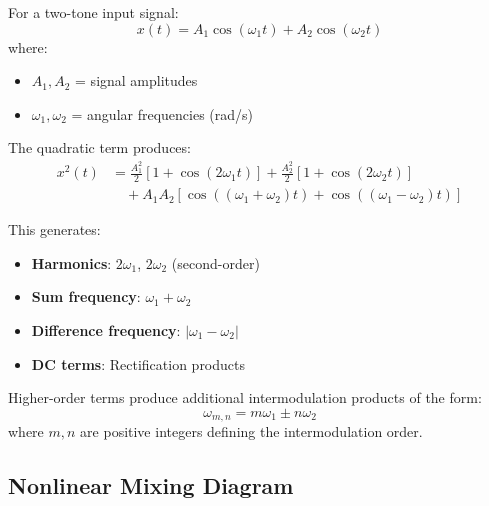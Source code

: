 For a two-tone input signal:
\begin{equation}
\label{eq:two-tone-input}
x(t) = A_1 \cos(\omega_1 t) + A_2 \cos(\omega_2 t)
\end{equation}
where:
\begin{itemize}
\item $A_1, A_2$ = signal amplitudes
\item $\omega_1, \omega_2$ = angular frequencies (rad/s)
\end{itemize}

The quadratic term produces:
\begin{align}
\label{eq:quadratic-mixing}
x^2(t) &= \frac{A_1^2}{2}[1 + \cos(2\omega_1 t)] + \frac{A_2^2}{2}[1 + \cos(2\omega_2 t)] \nonumber\\
&\quad + A_1 A_2[\cos((\omega_1+\omega_2)t) + \cos((\omega_1-\omega_2)t)]
\end{align}

This generates:
\begin{itemize}
\item \textbf{Harmonics}: $2\omega_1$, $2\omega_2$ (second-order)
\item \textbf{Sum frequency}: $\omega_1 + \omega_2$
\item \textbf{Difference frequency}: $|\omega_1 - \omega_2|$
\item \textbf{DC terms}: Rectification products
\end{itemize}

Higher-order terms produce additional intermodulation products of the form:
\begin{equation}
\label{eq:imd-products}
\omega_{m,n} = m\omega_1 \pm n\omega_2
\end{equation}
where $m, n$ are positive integers defining the intermodulation order.

\subsection{Nonlinear Mixing Diagram}

